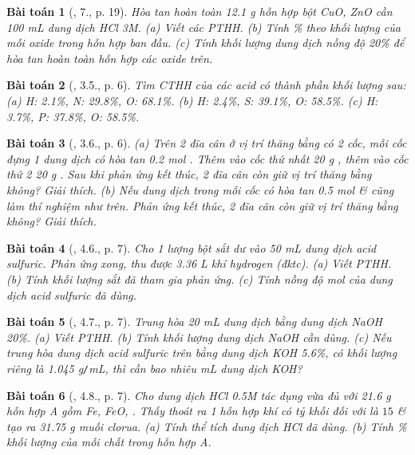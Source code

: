 \documentclass{article}
\newtheorem{baitoan}{Bài toán}
\begin{document}
\begin{baitoan}[\cite{SGK_Hoa_Hoc_9}, 7., p. 19]
	Hòa tan hoàn toàn \emph{12.1 g} hỗn hợp bột \emph{CuO, ZnO} cần \emph{100 mL} dung dịch \emph{HCl 3M}. (a) Viết các PTHH. (b) Tính \% theo khối lượng của mỗi oxide trong hỗn hợp ban đầu. (c) Tính khối lượng dung dịch \emph{} nồng độ \emph{20\%} để hòa tan hoàn toàn hỗn hợp các oxide trên.
\end{baitoan}

\begin{baitoan}[\cite{SBT_Hoa_Hoc_9}, 3.5., p. 6]
	Tìm CTHH của các acid có thành phần khối lượng sau: (a) \emph{H: 2.1\%, N: 29.8\%, O: 68.1\%}. (b) \emph{H: 2.4\%, S: 39.1\%, O: 58.5\%}. (c) \emph{H: 3.7\%, P: 37.8\%, O: 58.5\%}.
\end{baitoan}

\begin{baitoan}[\cite{SBT_Hoa_Hoc_9}, 3.6., p. 6]
	(a) Trên 2 đĩa cân ở vị trí thăng bằng có 2 cốc, mỗi cốc đựng 1 dung dịch có hòa tan \emph{0.2 mol }. Thêm vào cốc thứ nhất \emph{20 g }, thêm vào cốc thứ 2 \emph{20 g }. Sau khi phản ứng kết thúc, 2 đĩa cân còn giữ vị trí thăng bằng không? Giải thích. (b) Nếu dung dịch trong mỗi cốc có hòa tan \emph{0.5 mol } \& cũng làm thí nghiệm như trên. Phản ứng kết thúc, 2 đĩa cân còn giữ vị trí thăng bằng không? Giải thích.
\end{baitoan}

\begin{baitoan}[\cite{SBT_Hoa_Hoc_9}, 4.6., p. 7]
	Cho 1 lượng bột sắt dư vào \emph{50 mL} dung dịch acid sulfuric. Phản ứng xong, thu được \emph{3.36 L} khí hydrogen (đktc). (a) Viết PTHH. (b) Tính khối lượng sắt đã tham gia phản ứng. (c) Tính nồng độ mol của dung dịch acid sulfuric đã dùng.
\end{baitoan}

\begin{baitoan}[\cite{SBT_Hoa_Hoc_9}, 4.7., p. 7]
	Trung hòa \emph{20 mL} dung dịch \emph{} bằng dung dịch \emph{NaOH 20\%}. (a) Viết PTHH. (b) Tính khối lượng dung dịch \emph{NaOH} cần dùng. (c) Nếu trung hòa dung dịch acid sulfuric trên bằng dung dịch \emph{KOH 5.6\%}, có khối lượng riêng là \emph{1.045 g\texttt{/}mL}, thì cần bao nhiêu \emph{mL} dung dịch \emph{KOH}?
\end{baitoan}

\begin{baitoan}[\cite{SBT_Hoa_Hoc_9}, 4.8., p. 7]
	Cho dung dịch \emph{HCl 0.5M} tác dụng vừa đủ với \emph{21.6 g} hỗn hợp A gồm \emph{Fe, FeO, }. Thấy thoát ra 1 hỗn hợp khí có tỷ khối đối với \emph{} là $15$ \& tạo ra \emph{31.75 g} muối clorua. (a) Tính thể tích dung dịch \emph{HCl} đã dùng. (b) Tính \% khối lượng của mỗi chất trong hỗn hợp A.
\end{baitoan}
\end{document}
